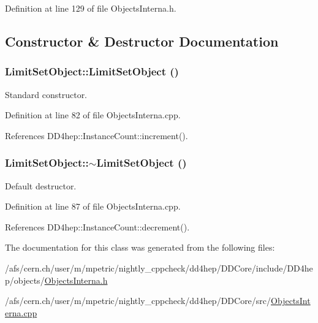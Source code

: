 Definition at line 129 of file ObjectsInterna.h.

\subsection{Constructor \& Destructor Documentation}
\hypertarget{class_d_d4hep_1_1_geometry_1_1_limit_set_object_a82ba3444d35470dba78073a03c00a368}{
\subsubsection[{LimitSetObject}]{\setlength{\rightskip}{0pt plus 5cm}LimitSetObject::LimitSetObject ()}}
\label{class_d_d4hep_1_1_geometry_1_1_limit_set_object_a82ba3444d35470dba78073a03c00a368}


Standard constructor. 

Definition at line 82 of file ObjectsInterna.cpp.

References DD4hep::InstanceCount::increment().\hypertarget{class_d_d4hep_1_1_geometry_1_1_limit_set_object_aa437df9d9fb981ac515d47efb876df1a}{
\subsubsection[{$\sim$LimitSetObject}]{\setlength{\rightskip}{0pt plus 5cm}LimitSetObject::$\sim$LimitSetObject ()}}
\label{class_d_d4hep_1_1_geometry_1_1_limit_set_object_aa437df9d9fb981ac515d47efb876df1a}


Default destructor. 

Definition at line 87 of file ObjectsInterna.cpp.

References DD4hep::InstanceCount::decrement().

The documentation for this class was generated from the following files:\begin{DoxyCompactItemize}
\item 
/afs/cern.ch/user/m/mpetric/nightly\_\-cppcheck/dd4hep/DDCore/include/DD4hep/objects/\hyperlink{_objects_interna_8h}{ObjectsInterna.h}\item 
/afs/cern.ch/user/m/mpetric/nightly\_\-cppcheck/dd4hep/DDCore/src/\hyperlink{_objects_interna_8cpp}{ObjectsInterna.cpp}\end{DoxyCompactItemize}
